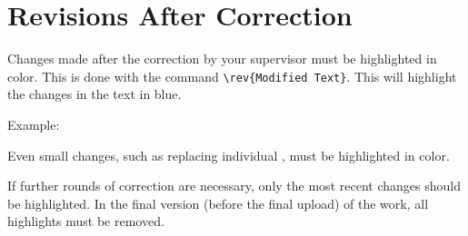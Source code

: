 %
%

\section{Revisions After Correction}
\label{sec:revisionsAfterCorrection}

Changes made after the correction by your supervisor must be highlighted in color. This is done with the command \verb|\rev{Modified Text}|. This will highlight the changes in the text in blue.

Example:\\

Even small changes, such as replacing individual , must be highlighted in color.

If further rounds of correction are necessary, only the most recent changes should be highlighted. In the final version (before the final upload) of the work, all highlights must be removed.